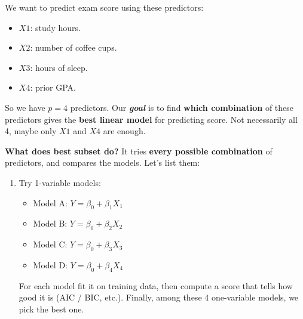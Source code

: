 \highspace
\begin{examplebox}
    We want to predict exam score using these predictors:
    \begin{itemize}
        \item $X1$: study hours.
        \item $X2$: number of coffee cups.
        \item $X3$: hours of sleep.
        \item $X4$: prior GPA.
    \end{itemize}
    So we have $p = 4$ predictors. Our \emph{\textbf{goal}} is to find \textbf{which combination} of these predictors gives the \textbf{best linear model} for predicting score. Not necessarily all 4, maybe only $X1$ and $X4$ are enough.

    \highspace
    \textcolor{Green3}{ \textbf{What does best subset do?}} It tries \textbf{every possible combination} of predictors, and compares the models. Let's list them:
    \begin{enumerate}
        \item Try 1-variable models:
        \begin{itemize}
            \item Model A: $Y = \beta_0 + \beta_1 X_1$
            \item Model B: $Y = \beta_0 + \beta_2 X_2$
            \item Model C: $Y = \beta_0 + \beta_3 X_3$
            \item Model D: $Y = \beta_0 + \beta_4 X_4$
        \end{itemize}
        For each model fit it on training data, then compute a score that tells how good it is (AIC / BIC, etc.). Finally, among these 4 one-variable models, we pick the best one.


\end{enumerate}
\end{examplebox}
